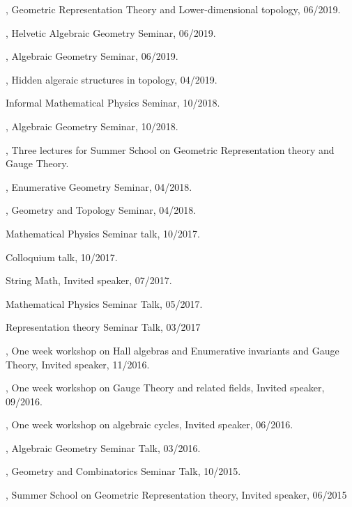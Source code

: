 \documentclass[11pt]{amsart}
\theoremstyle{plain}
\theoremstyle{definition}
\theoremstyle{remark}
\begin{document}
, Geometric Representation Theory and Lower-dimensional topology, 06/2019.

,  Helvetic Algebraic Geometry Seminar, 06/2019.

, Algebraic Geometry Seminar, 06/2019.

, Hidden algeraic structures in topology, 04/2019.

 Informal Mathematical Physics Seminar, 10/2018.

, Algebraic Geometry Seminar, 10/2018.

, Three lectures for Summer School on Geometric Representation theory and
Gauge Theory.

, Enumerative Geometry Seminar, 04/2018.

, Geometry and  Topology Seminar, 04/2018.

 Mathematical Physics Seminar talk, 10/2017.

 Colloquium talk, 10/2017.

 String Math, Invited speaker, 07/2017.

 Mathematical Physics Seminar Talk, 05/2017.

 Representation theory Seminar Talk, 03/2017

, One week workshop on Hall algebras and Enumerative invariants and Gauge Theory, Invited speaker, 11/2016.

, One week workshop on Gauge Theory and related fields, Invited speaker, 09/2016.

, One week workshop on algebraic cycles, Invited speaker, 06/2016.

, Algebraic Geometry Seminar Talk, 03/2016.


, Geometry and Combinatorics Seminar Talk, 10/2015.

, Summer School on Geometric Representation theory, Invited speaker, 06/2015
\end{document}
